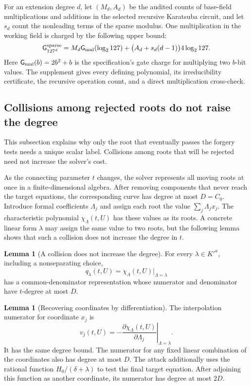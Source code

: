 \documentclass[11pt,a4paper]{article}
\theoremstyle{definition}
\newtheorem{lemma}[theorem]{Lemma}
\theoremstyle{remark}
\newcommand{\Gmul}{\mathsf G_{\rm mul}}
\begin{document}
For an extension degree $d$, let $(M_d,A_d)$ be the audited counts of base-field
multiplications and additions in the selected recursive Karatsuba circuit, and
let $s_d$ count the nonleading terms of the sparse modulus.  One multiplication
in the working field is charged by the following upper bound:
\begin{equation}\label{eq:sparse-extension-envelope}
 \mathsf G^{\rm sparse}_{127^d}
 =M_d\Gmul(\log_2 127)
  +\bigl(A_d+s_d(d-1)\bigr)4\log_2 127.
\end{equation}
Here $\Gmul(b)=2b^2+b$ is the specification's gate charge for multiplying two
$b$-bit values.  The supplement gives every defining polynomial, its
irreducibility certificate, the recursive operation count, and a direct
multiplication cross-check.

\subsection{Collisions among rejected roots do not raise the degree}
\label{sec:charpoly}

This subsection explains why only the root that eventually passes the forgery
tests needs a unique scalar label.  Collisions among roots that will be
rejected need not increase the solver's cost.

As the connecting parameter $t$ changes, the solver represents all moving
roots at once in a finite-dimensional algebra.  After removing components that never reach the
target equations, the corresponding curve has degree at most $D=C_0$.
Introduce formal coefficients $\Lambda_j$ and assign each root the value
$\sum_j\Lambda_jx_j$.  The characteristic polynomial
$\chi_\Lambda(t,U)$ has these values as its roots.  A concrete linear form
$\lambda$ may assign the same value to two roots, but the following lemma
shows that such a collision does not increase the degree in $t$.

\begin{lemma}[A collision does not increase the degree]
\label{lem:charpoly}
For every $\lambda\in K'^a$, including a nonseparating choice,
\[
 q_\lambda(t,U)=\chi_\Lambda(t,U)|_{\Lambda=\lambda}
\]
has a common-denominator representation whose numerator and denominator have
$t$-degree at most $D$.
\end{lemma}

\begin{lemma}[Recovering coordinates by differentiation]\label{lem:polar}
The interpolation numerator for coordinate $x_j$ is
\[
 v_j(t,U)=-
 \left.\frac{\partial\chi_\Lambda(t,U)}{\partial\Lambda_j}
 \right|_{\Lambda=\lambda}.
\]
It has the same degree bound.  The numerator for any fixed linear combination
of the coordinates also has degree at most $D$.  The attack additionally uses
the rational function $H_0/(\delta+\lambda)$ to test the final target equation.
After adjoining this function as another coordinate, its numerator has degree
at most $2D$.
\end{lemma}
\end{document}
